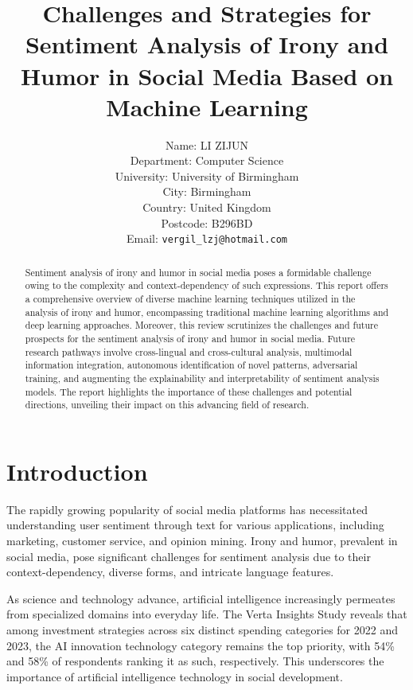 \documentclass[a4paper]{article}
\title{\textbf{Challenges and Strategies for Sentiment Analysis of Irony and Humor in Social Media Based on Machine Learning}}
\author{
    Name: LI ZIJUN\\
    Department: Computer Science\\
    University: University of Birmingham\\
    City: Birmingham\\
    Country: United Kingdom\\
    Postcode: B296BD\\
    Email: \texttt{vergil\_lzj@hotmail.com}
}
\date{}
\begin{document}
\setlength{\parindent}{2em}

\maketitle
\thispagestyle{empty}

\begin{abstract}
    Sentiment analysis of irony and humor in social media poses a formidable challenge owing to the complexity and context-dependency of such expressions. This report offers a comprehensive overview of diverse machine learning techniques utilized in the analysis of irony and humor, encompassing traditional machine learning algorithms and deep learning approaches.  Moreover, this review scrutinizes the challenges and future prospects for the sentiment analysis of irony and humor in social media. Future research pathways involve cross-lingual and cross-cultural analysis, multimodal information integration, autonomous identification of novel patterns, adversarial training, and augmenting the explainability and interpretability of sentiment analysis models. The report highlights the importance of these challenges and potential directions, unveiling their impact on this advancing field of research.
\end{abstract}


\newpage
\setcounter{page}{1}
\section{Introduction}

The rapidly growing popularity of social media platforms has necessitated understanding user sentiment through text for various applications, including marketing, customer service, and opinion mining. Irony and humor, prevalent in social media, pose significant challenges for sentiment analysis due to their context-dependency, diverse forms, and intricate language features.

As science and technology advance, artificial intelligence increasingly permeates from specialized domains into everyday life. The Verta Insights Study\cite{ref_web1} reveals that among investment strategies across six distinct spending categories for 2022 and 2023, the AI innovation technology category remains the top priority, with 54\% and 58\% of respondents ranking it as such, respectively. This underscores the importance of artificial intelligence technology in social development.
\end{document}
